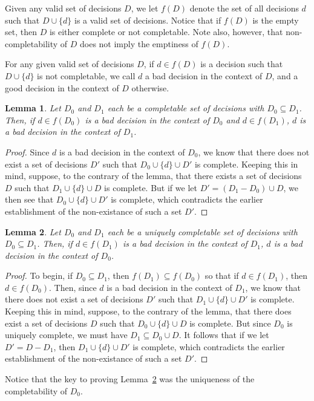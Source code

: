 \documentclass[12pt]{article}
\numberwithin{equation}{section}
\newtheorem{lemma}{Lemma}[section]
\begin{document}
Given any valid set of decisions $D$, we let $f(D)$ denote the set of all
decisions $d$ such that $D\cup\{d\}$ is a valid set
of decisions.  Notice that if $f(D)$ is the empty set, then $D$ is either complete
or not completable.  Note also, however, that non-completability of $D$ does not
imply the emptiness of $f(D)$.

For any given valid set of decisions $D$, if $d\in f(D)$ is a decision
such that $D\cup\{d\}$ is not completable, we call $d$ a bad decision in
the context of $D$, and a good decision in the context of $D$ otherwise.

\begin{lemma}\label{lma_d0_bad_imp_d1_bad}
Let $D_0$ and $D_1$ each be a completable set of decisions with $D_0\subseteq D_1$.
Then, if $d\in f(D_0)$ is a bad decision in the context of $D_0$ and $d\in f(D_1)$, $d$ is a bad decision
in the context of $D_1$.
\end{lemma}
\begin{proof}
Since $d$ is a bad decision in the context of $D_0$, we know that there does not exist a
set of decisions $D'$ such that $D_0\cup\{d\}\cup D'$ is complete.  Keeping this in mind, suppose,
to the contrary of the lemma, that there exists a set of decisions $D$ such that $D_1\cup\{d\}\cup D$
is complete.  But if we let $D'=(D_1-D_0)\cup D$, we then see that $D_0\cup\{d\}\cup D'$ is
complete, which contradicts the earlier establishment of the non-existance of such a set $D'$.
\end{proof}

\begin{lemma}\label{lma_d1_bad_imp_d0_bad}
Let $D_0$ and $D_1$ each be a uniquely completable set of decisions with $D_0\subseteq D_1$.
Then, if $d\in f(D_1)$ is a bad decision in the context of $D_1$, $d$ is a bad decision
in the context of $D_0$.
\end{lemma}
\begin{proof}
To begin, if $D_0\subseteq D_1$, then $f(D_1)\subseteq f(D_0)$ so that if $d\in f(D_1)$,
then $d\in f(D_0)$.  Then, since $d$ is a bad decision in the context of $D_1$, we know that
there does not exist a set of decisions $D'$ such that $D_1\cup\{d\}\cup D'$ is complete.
Keeping this in mind, suppose, to the contrary of the lemma, that there does exist a set of
decisions $D$ such that $D_0\cup\{d\}\cup D$ is complete.  But since $D_0$ is uniquely
complete, we must have $D_1\subseteq D_0\cup D$.  It follows that if we let $D'=D-D_1$,
then $D_1\cup\{d\}\cup D'$ is complete, which contradicts the earlier establishment of
the non-existance of such a set $D'$.
\end{proof}
Notice that the key to proving Lemma~\ref{lma_d1_bad_imp_d0_bad} was the uniqueness of the
completability of $D_0$.
\end{document}
